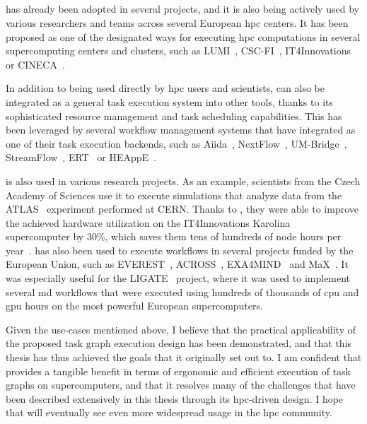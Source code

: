 \subsection*{\hyperqueue{}}
\hyperqueue{} has already been adopted in several projects, and it is also being
actively used by various researchers and teams across several European \gls{hpc}
centers. It has been proposed as one of the designated ways for executing
\gls{hpc} computations in several supercomputing centers and clusters, such as
LUMI~\cite{it4i-lumi}, CSC-FI~\cite{puhti-hq,puhti-hq-2},
IT4Innovations~\cite{it4i-hq} or CINECA~\cite{cineca}.

In addition to being used directly by \gls{hpc} users and scientists,
\hyperqueue{} can also be integrated as a general task execution system into other
tools, thanks to its sophisticated resource management and task scheduling capabilities. This has
been leveraged by several workflow management systems that have integrated
\hyperqueue{} as one of their task execution backends, such as
Aiida~\cite{aiida-hq}, NextFlow~\cite{nextflow-hq},
UM-Bridge~\cite{umbridge}, StreamFlow~\cite{streamflow-hq},
ERT~\cite{ert} or HEAppE~\cite{heappe}.

\hyperqueue{} is also used in various research projects. As an example,
scientists from the Czech Academy of Sciences use it to execute simulations that analyze data from
the ATLAS~\cite{atlas} experiment performed at CERN. Thanks to
\hyperqueue{}, they were able to improve the achieved hardware utilization on the
IT4Innovations Karolina~\cite{karolina} supercomputer by 30\%, which saves them tens of
hundreds of node hours per year~\cite{cern-hq}. \hyperqueue{} has also
been used to execute workflows in several projects funded by the European Union, such as
EVEREST~\cite{everest}, ACROSS~\cite{across},
EXA4MIND~\cite{exa4mind} and MaX~\cite{max}. It was especially useful
for the LIGATE~\cite{ligate} project, where it was used to implement several
\gls{md} workflows that were executed using hundreds of thousands of
\gls{cpu} and \gls{gpu} hours on the most powerful European
supercomputers.

Given the use-cases mentioned above, I believe that the practical applicability of the proposed
task graph execution design has been demonstrated, and that this thesis has thus achieved the goals
that it originally set out to. I am confident that \hyperqueue{} provides a tangible
benefit in terms of ergonomic and efficient execution of task graphs on supercomputers, and that it
resolves many of the challenges that have been described extensively in this thesis through its
\gls{hpc}-driven design. I hope that \hyperqueue{} will eventually
see even more widespread usage in the \gls{hpc} community.
